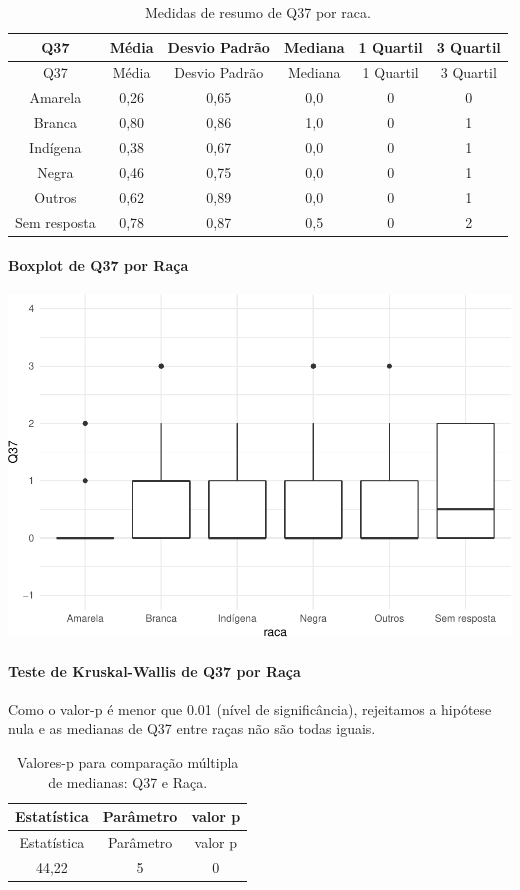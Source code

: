 \documentclass[]{article}
\let\oldparagraph\paragraph
\renewcommand{\paragraph}[1]{\oldparagraph{#1}\mbox{}}
\begin{document}
\begin{longtable}[]{@{}cccccc@{}}
\caption{\label{tab:unnamed-chunk-1404}Medidas de resumo de Q37 por raca.}\tabularnewline
\toprule
Q37 & Média & Desvio Padrão & Mediana & 1 Quartil & 3 Quartil\tabularnewline
\midrule
\endfirsthead
\toprule
Q37 & Média & Desvio Padrão & Mediana & 1 Quartil & 3 Quartil\tabularnewline
\midrule
\endhead
Amarela & 0,26 & 0,65 & 0,0 & 0 & 0\tabularnewline
Branca & 0,80 & 0,86 & 1,0 & 0 & 1\tabularnewline
Indígena & 0,38 & 0,67 & 0,0 & 0 & 1\tabularnewline
Negra & 0,46 & 0,75 & 0,0 & 0 & 1\tabularnewline
Outros & 0,62 & 0,89 & 0,0 & 0 & 1\tabularnewline
Sem resposta & 0,78 & 0,87 & 0,5 & 0 & 2\tabularnewline
\bottomrule
\end{longtable}

\hypertarget{boxplot-de-q37-por-rauxe7a}{%
\paragraph{Boxplot de Q37 por Raça}\label{boxplot-de-q37-por-rauxe7a}}

\begin{center}\includegraphics[width=0.75\linewidth]{relatorio_covid19_files/figure-latex/unnamed-chunk-1405-1} \end{center}

\hypertarget{teste-de-kruskal-wallis-de-q37-por-rauxe7a}{%
\paragraph{Teste de Kruskal-Wallis de Q37 por Raça}\label{teste-de-kruskal-wallis-de-q37-por-rauxe7a}}

Como o valor-p é menor que 0.01 (nível de significância), rejeitamos a hipótese nula e as medianas de Q37 entre raças não são todas iguais.

\begin{longtable}[]{@{}ccc@{}}
\caption{\label{tab:unnamed-chunk-1407}Valores-p para comparação múltipla de medianas: Q37 e Raça.}\tabularnewline
\toprule
Estatística & Parâmetro & valor p\tabularnewline
\midrule
\endfirsthead
\toprule
Estatística & Parâmetro & valor p\tabularnewline
\midrule
\endhead
44,22 & 5 & 0\tabularnewline
\bottomrule
\end{longtable}
\end{document}
